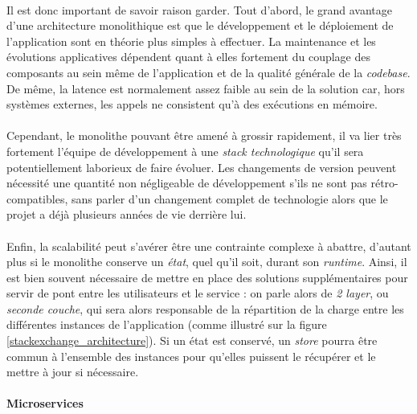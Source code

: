 \paragraph{} Il est donc important de savoir raison garder. Tout d'abord, le grand avantage d'une architecture monolithique
est que le développement et le déploiement de l'application sont en théorie plus simples à effectuer. La maintenance et 
les évolutions applicatives dépendent quant à elles fortement du couplage des composants au sein même de l'application et 
de la qualité générale de la \emph{codebase}. De même, la latence est normalement assez faible au sein de la solution car,
hors systèmes externes, les appels ne consistent qu'à des exécutions en mémoire.

\paragraph{} Cependant, le monolithe pouvant être amené à grossir rapidement, il va lier très fortement l'équipe de développement
à une \emph{stack technologique} qu'il sera potentiellement laborieux de faire évoluer. Les changements de version peuvent 
nécessité une quantité non négligeable de développement s'ils ne sont pas rétro-compatibles, sans parler d'un changement 
complet de technologie alors que le projet a déjà plusieurs années de vie derrière lui.

\paragraph{} Enfin, la scalabilité peut s'avérer être une contrainte complexe à abattre, d'autant plus si le monolithe
conserve un \emph{état}, quel qu'il soit, durant son \emph{runtime}. Ainsi, il est bien souvent nécessaire de mettre en place
des solutions supplémentaires pour servir de pont entre les utilisateurs et le service : on parle alors de \emph{2 layer},
ou \emph{seconde couche}, qui sera alors responsable de la répartition de la charge entre les différentes instances de l'application
(comme illustré sur la figure \ref{stackexchange_architecture}). Si un état est conservé, un \emph{store} pourra être commun
à l'ensemble des instances pour qu'elles puissent le récupérer et le mettre à jour si nécessaire.


\paragraph{Microservices} \cite{Microservices0} \cite{Microservices1} \cite{Microservices2}

